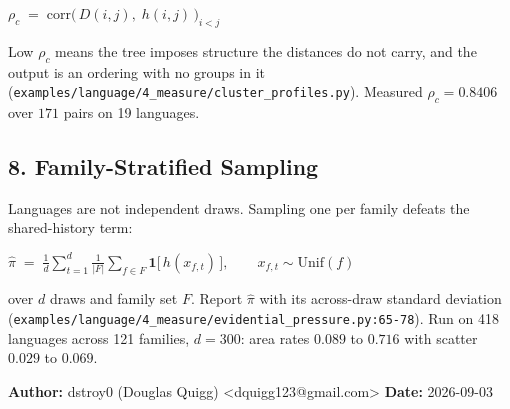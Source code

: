 \(\rho_c \;=\; \mathrm{corr}\bigl(\,D(i,j),\; h(i,j)\,\bigr)_{i < j}\)

Low \(\rho_c\) means the tree imposes structure the distances do not carry, and the output is an ordering with no groups in it (\texttt{examples/\allowbreak{}language/\allowbreak{}4\_\allowbreak{}measure/\allowbreak{}cluster\_\allowbreak{}profiles.\allowbreak{}py}). Measured \(\rho_c = 0.8406\) over \(171\) pairs on 19 languages.

\subsection{8. Family-Stratified Sampling}

Languages are not independent draws. Sampling one per family defeats the shared-history term:

\(\hat{\pi} \;=\; \frac{1}{d}\sum_{t=1}^{d} \frac{1}{|F|}\sum_{f \in F} \mathbf{1}\bigl[\,h(x_{f,t})\,\bigr], \qquad x_{f,t} \sim \mathrm{Unif}(f)\)

over \(d\) draws and family set \(F\). Report \(\hat{\pi}\) with its across-draw standard deviation (\texttt{examples/\allowbreak{}language/\allowbreak{}4\_\allowbreak{}measure/\allowbreak{}evidential\_\allowbreak{}pressure.\allowbreak{}py:65-\allowbreak{}78}). Run on 418 languages across 121 families, \(d=300\): area rates \(0.089\) to \(0.716\) with scatter \(0.029\) to \(0.069\).

\textbf{Author:} dstroy0 (Douglas Quigg) <dquigg123@gmail.com> \textbf{Date:} 2026-09-03

